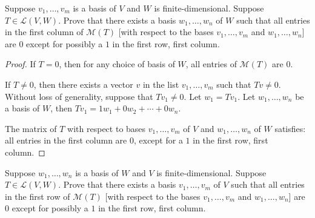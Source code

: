 \begin{exercise}
    Suppose $v_{1}, \ldots, v_{m}$ is a basis of $V$ and $W$ is finite-dimensional. Suppose $T \in \mathcal{L}(V, W)$. Prove that there exists a basis $w_{1}, \ldots, w_{n}$ of $W$ such that all entries in the first column of $\mathcal{M}(T)$ [with respect to the bases $v_{1}, \ldots, v_{m}$ and $w_{1}, \ldots, w_{n}$] are $0$ except for possibly a $1$ in the first row, first column.
\end{exercise}

\begin{proof}
    If $T = 0$, then for any choice of basis of $W$, all entries of $\mathcal{M}(T)$ are $0$.

    If $T\ne 0$, then there exists a vector $v$ in the list $v_{1}, \ldots, v_{m}$ such that $Tv\ne 0$. Without loss of generality, suppose that $Tv_{1}\ne 0$. Let $w_{1} = Tv_{1}$. Let $w_{1}, \ldots, w_{n}$ be a basis of $W$, then $Tv_{1} = 1w_{1} + 0w_{2} + \cdots + 0w_{n}$.

    The matrix of $T$ with respect to bases $v_{1}, \ldots, v_{m}$ of $V$ and $w_{1}, \ldots, w_{n}$ of $W$ satisfies: all entries in the first column are $0$, except for a $1$ in the first row, first column.
\end{proof}
\newpage

\begin{exercise}
    Suppose $w_{1}, \ldots, w_{n}$ is a basis of $W$ and $V$ is finite-dimensional. Suppose $T \in \mathcal{L}(V, W)$. Prove that there exists a basis $v_{1}, \ldots, v_{m}$ of $V$ such that all entries in the first row of $\mathcal{M}(T)$ [with respect to the bases $v_{1}, \ldots, v_{m}$ and $w_{1}, \ldots, w_{n}$] are $0$ except for possibly a $1$ in the first row, first column.
\end{exercise}

